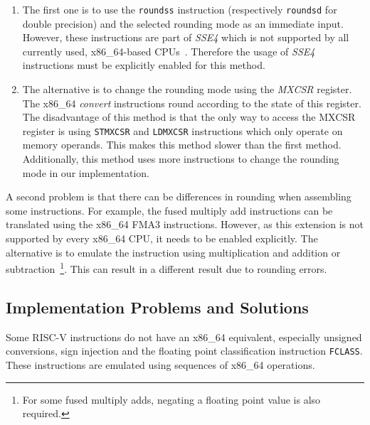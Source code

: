 \documentclass[course=eragp]{aspdoc}
\begin{document}
\begin{enumerate}
    \item The first one is to use the \texttt{roundss} instruction (respectively \texttt{roundsd}
          for double precision) and the selected rounding mode as an immediate input. However, these
          instructions are part of \textit{SSE4} which is not supported by all currently used, x86\_64-based
          CPUs~\cite{intel2017man}. Therefore the usage of \textit{SSE4} instructions must be explicitly enabled for
          this method.

    \item The alternative is to change the rounding mode using the \emph{MXCSR} register. The
          x86\_64 \emph{convert} instructions round according to the state of this register.
          The disadvantage of this method is that the only way to access the MXCSR register
          is using \texttt{STMXCSR} and \texttt{LDMXCSR} instructions which only operate on
          memory operands. This makes this method slower than the first method. Additionally,
          this method uses more instructions to change the rounding mode in our implementation.~\cite{intel2017man}
\end{enumerate}

\par


A second problem is that there can be differences in rounding when assembling some instructions. For
example, the fused multiply add instructions can be translated using the x86\_64 FMA3 instructions.
However, as this extension is not supported by every x86\_64 CPU, it needs to be enabled explicitly. The alternative
is to emulate the instruction using multiplication and addition or subtraction~\footnote{For some
    fused multiply adds, negating a floating point value is also required.}. This can result in a
different result due to rounding errors.


\subsection{Implementation Problems and Solutions}

Some RISC-V instructions do not have an x86\_64 equivalent, especially unsigned conversions, sign
injection and the floating point classification instruction \texttt{FCLASS}. These instructions
are emulated using sequences of x86\_64 operations.


\par
\end{document}
